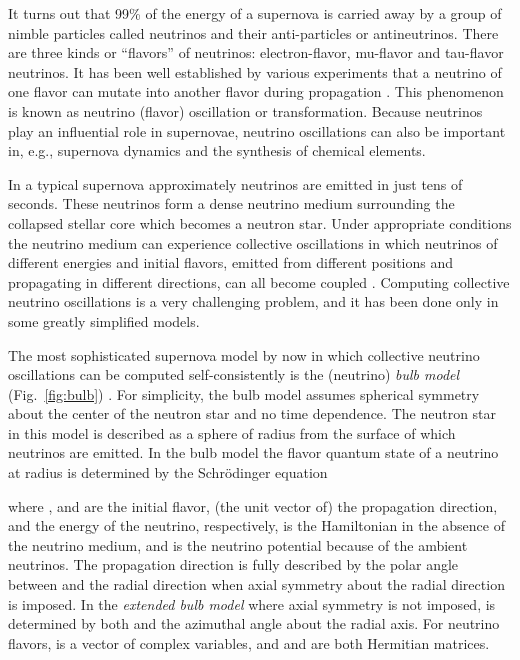 \documentclass{sig-alternate}
\begin{document}
It turns out
that 99\% of the energy of a supernova is carried away
by a group of nimble particles called neutrinos and their
anti-particles or antineutrinos. There are three kinds
or ``flavors'' of neutrinos: electron-flavor, mu-flavor and tau-flavor
neutrinos. It has been well established by various experiments that
a neutrino of one flavor can mutate into another flavor during
propagation \cite{Agashe:2014kda}. This phenomenon is known as neutrino
(flavor) oscillation 
or transformation. Because neutrinos play an influential role in supernovae,
neutrino oscillations can also be important in, e.g., supernova
dynamics and the synthesis of chemical elements.

In a typical supernova approximately  neutrinos are emitted
in just tens of seconds. These neutrinos form a dense neutrino medium
surrounding the collapsed stellar core which becomes a neutron
star. Under appropriate conditions the neutrino medium can experience
collective oscillations in which neutrinos of different energies and
initial flavors, emitted from different positions and propagating in
different directions, can all become coupled \cite{Duan:2010bg}.
Computing collective neutrino oscillations is a very challenging
problem, and it has been done only in some greatly simplified models.

The most sophisticated supernova model by now in which collective neutrino
oscillations can be computed self-consistently is the (neutrino) \emph{bulb
model} (Fig.~\ref{fig:bulb}) \cite{Duan_Simulation_2006}. For
simplicity, the bulb model assumes 
spherical symmetry about the center of the neutron star and 
no time dependence. The neutron star in this model is
described as a sphere of radius  from the surface of which
neutrinos are emitted. 
In the bulb model the flavor
quantum state  of a neutrino at radius  is
determined by the Schr\"odinger equation

where ,  and  are the initial flavor, (the unit vector
of) the propagation direction, and the energy of the neutrino,
respectively,  is the Hamiltonian in the absence of the
neutrino medium, and  is the neutrino potential because of
the ambient neutrinos. 
The propagation direction  is fully described by the polar angle
 between  and the radial direction when axial
symmetry about the radial direction is imposed. In the \emph{extended bulb
model} \cite{Mirizzi:2013rla} where axial symmetry is not imposed,
 is determined by both  and the azimuthal angle
 about the radial axis.
For  neutrino flavors,  is a vector of
 complex variables, and  and  are both 
Hermitian matrices. 
\end{document}
